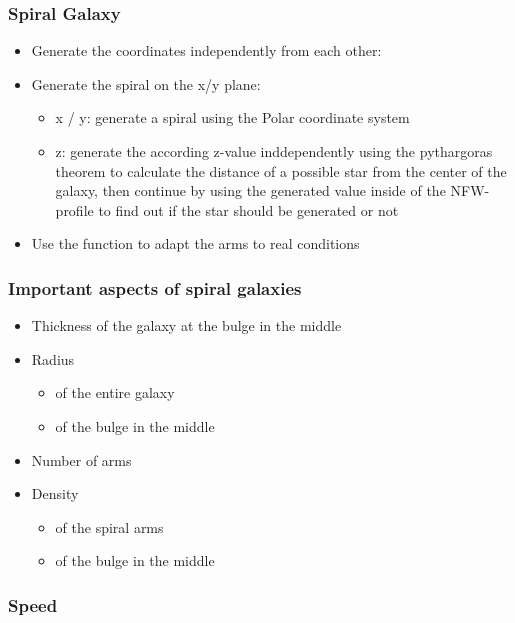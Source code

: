 \documentclass[a4paper,12pt]{scrartcl}
\begin{document}
\subsubsection{Spiral Galaxy}

\begin{itemize}
  \item Generate the coordinates independently from each other:

  \item Generate the spiral on the x/y plane:
  \begin{itemize}
    \item x / y: generate a spiral using the Polar coordinate system
    \item z: generate the according z-value inddependently using the pythargoras
    theorem to calculate the distance of a possible star from the center of the
    galaxy, then continue by using the generated value inside of the NFW-profile
    to find out if the star should be generated or not
  \end{itemize}
  \item Use the function to adapt the arms to real conditions
\end{itemize}

\subsubsection{Important aspects of spiral galaxies}

\begin{itemize}
  \item Thickness of the galaxy at the bulge in the middle
  \item Radius
  \begin{itemize}
    \item of the entire galaxy
    \item of the bulge in the middle
  \end{itemize}
  \item Number of arms
  \item Density
  \begin{itemize}
    \item of the spiral arms
    \item of the bulge in the middle
  \end{itemize}
\end{itemize}

\subsubsection{Speed}
\end{document}
